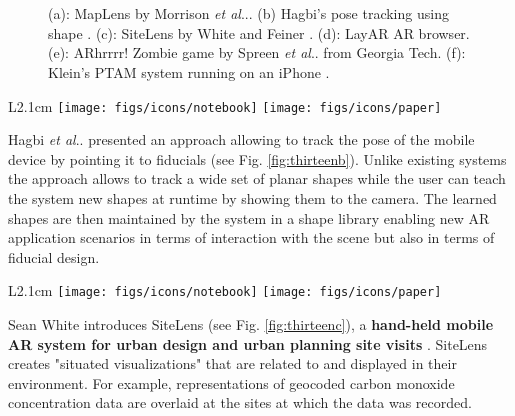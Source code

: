 \documentclass[12pt,a4paper]{article}
\makeatletter
\DeclareRobustCommand\onedot{\futurelet\@let@token\@onedot}
\def\@onedot{\ifx\@let@token.\else.\null\fi\xspace}
\def\etal{\emph{et al}\onedot}
\makeatother
\begin{document}
\begin{figure}[tbp]
\centering
\vspace{-35pt}
 \hfill
{}\\  \hfill
{} \hfill 
{}  \\
 \hfill 
{}
\vspace{-10pt}
\caption{(a): MapLens by Morrison \etal \cite{Morrison09}. (b) Hagbi's pose tracking using shape \cite{Bergig09}. (c): SiteLens by White and Feiner \cite{White09}. (d): LayAR AR browser. (e): ARhrrrr! Zombie game by Spreen \etal from Georgia Tech. (f): Klein's PTAM system running on an iPhone \cite{Klein09}. } \label{fig:thirteen}
\end{figure}

\vspace{0.1in}

\begin{wrapfigure}{L}{2.1cm}
	\vspace{-12pt}	
	\texttt{[image: figs/icons/notebook]}
	\texttt{[image: figs/icons/paper]}	
	\vspace{-28pt}		
\end{wrapfigure}
\noindent Hagbi \etal presented an approach allowing to track the pose of the mobile device by pointing it to fiducials \cite{Bergig09} (see Fig. \ref{fig:thirteenb}). Unlike existing systems the approach allows to track a wide set of planar shapes while the user can teach the system new shapes at runtime by showing them to the camera. The learned shapes are then maintained by the system in a shape library enabling new AR application scenarios in terms of interaction with the scene but also in terms of fiducial design.

\vspace{0.1in}

\begin{wrapfigure}{L}{2.1cm}
	\vspace{-15pt}	
	\texttt{[image: figs/icons/notebook]}
	\texttt{[image: figs/icons/paper]}	
	\vspace{-25pt}		
\end{wrapfigure}
\noindent Sean White introduces SiteLens (see Fig. \ref{fig:thirteenc}), a \textbf{hand-held mobile AR system for urban design and urban planning site visits} \cite{White09}. SiteLens creates "situated visualizations" that are related to and displayed in their environment. For example, representations of geocoded carbon monoxide concentration data are overlaid at the sites at which the data
was recorded.
\end{document}
